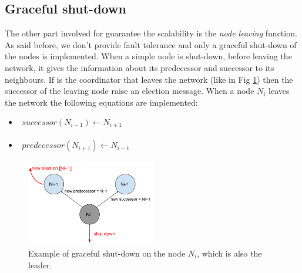 \documentclass[11pt,conference]{IEEEtran}
\begin{document}
\subsection{Graceful shut-down}
\label{chap:graceful}
The other part involved for guarantee the scalability is the \textit{node leaving} function. As said before, we don't provide fault tolerance and only a graceful shut-down of the nodes is implemented. When a simple node is shut-down, before leaving the network, it gives the information about its predecessor and successor to its neighbours. If is the coordinator that leaves the network (like in Fig \ref{fig:graceful}) then the successor of the leaving node raise an election message.
\newline
When a node $N_i$ leaves the network the following equations are implemented:
\begin{itemize}
\item[] $\begin{aligned}
    successor(N_{i-1}) \leftarrow N_{i+1}
\end{aligned}$
\item[] $\begin{aligned}
    predecessor(N_{i+1}) \leftarrow N_{i-1}
\end{aligned}$
\end{itemize}

\begin{figure}[h!]
  \centering
    \includegraphics[width=0.5\textwidth]{graceful}
    \caption{Example of graceful shut-down on the node $N_i$, which is also the leader.}
    \label{fig:graceful}
\end{figure}
\end{document}
